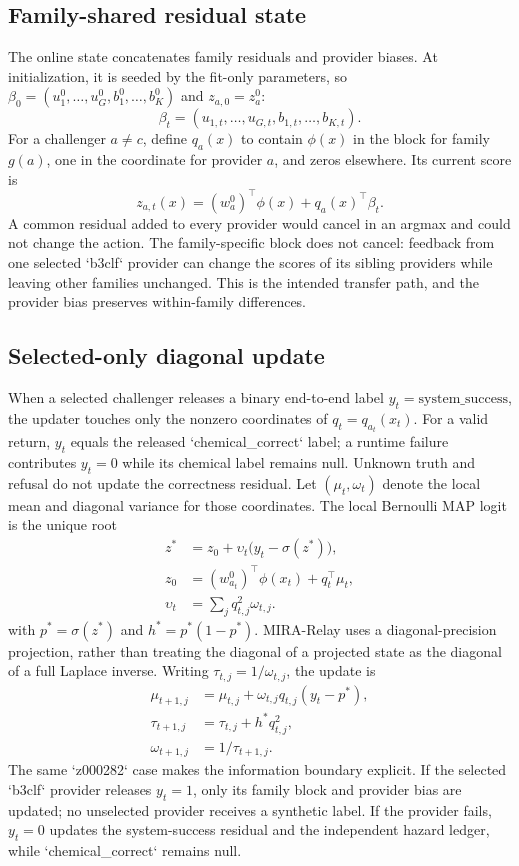 \documentclass[sigconf,anonymous]{aamas}
\begin{document}
\subsection{Family-shared residual state}
The online state concatenates family residuals and provider biases. At initialization, it is seeded by the fit-only parameters, so $\beta_0=(u_1^0,\ldots,u_G^0,b_1^0,\ldots,b_K^0)$ and $z_{a,0}=z_a^0$:
$$
\beta_t=(u_{1,t},\ldots,u_{G,t},b_{1,t},\ldots,b_{K,t}).
$$
For a challenger $a\neq c$, define $q_a(x)$ to contain $\phi(x)$ in the block for family $g(a)$, one in the coordinate for provider $a$, and zeros elsewhere. Its current score is
$$
z_{a,t}(x)=(w_a^0)^\top\phi(x)+q_a(x)^\top\beta_t.
$$
A common residual added to every provider would cancel in an argmax and could not change the action. The family-specific block does not cancel: feedback from one selected `b3clf` provider can change the scores of its sibling providers while leaving other families unchanged. This is the intended transfer path, and the provider bias preserves within-family differences.

\subsection{Selected-only diagonal update}
When a selected challenger releases a binary end-to-end label $y_t=\mathrm{system\_success}$, the updater touches only the nonzero coordinates of $q_t=q_{a_t}(x_t)$. For a valid return, $y_t$ equals the released `chemical\_correct` label; a runtime failure contributes $y_t=0$ while its chemical label remains null. Unknown truth and refusal do not update the correctness residual. Let $(\mu_t,\omega_t)$ denote the local mean and diagonal variance for those coordinates. The local Bernoulli MAP logit is the unique root
$$
\begin{aligned}
z^*&=z_0+\upsilon_t\bigl(y_t-\sigma(z^*)\bigr),\\
z_0&=(w_{a_t}^0)^\top\phi(x_t)+q_t^\top\mu_t,\\
\upsilon_t&=\sum_j q_{t,j}^2\omega_{t,j}.
\end{aligned}
$$
with $p^*=\sigma(z^*)$ and $h^*=p^*(1-p^*)$. MIRA-Relay uses a diagonal-precision projection, rather than treating the diagonal of a projected state as the diagonal of a full Laplace inverse. Writing $\tau_{t,j}=1/\omega_{t,j}$, the update is
$$
\begin{aligned}
\mu_{t+1,j}&=\mu_{t,j}+\omega_{t,j}q_{t,j}(y_t-p^*),\\
\tau_{t+1,j}&=\tau_{t,j}+h^*q_{t,j}^2,\\
\omega_{t+1,j}&=1/\tau_{t+1,j}.
\end{aligned}
$$
The same `z000282` case makes the information boundary explicit. If the selected `b3clf` provider releases $y_t=1$, only its family block and provider bias are updated; no unselected provider receives a synthetic label. If the provider fails, $y_t=0$ updates the system-success residual and the independent hazard ledger, while `chemical\_correct` remains null.
\end{document}

